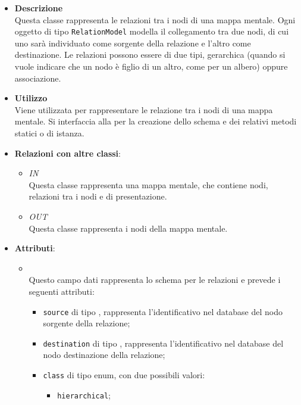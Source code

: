 \begin{itemize}
\item \textbf{Descrizione}\\
Questa classe rappresenta le relazioni tra i nodi di una mappa mentale. Ogni oggetto di tipo \texttt{RelationModel} modella il collegamento tra due nodi, di cui uno sarà individuato come sorgente della relazione e l’altro come destinazione. Le relazioni possono essere di due tipi, gerarchica (quando si vuole indicare che un nodo è figlio di un altro, come per un albero) oppure associazione.
\item \textbf{Utilizzo}\\
Viene utilizzata per rappresentare le relazione tra i nodi di una mappa mentale. Si interfaccia alla   per la creazione dello schema e dei relativi metodi statici o di istanza.
\item \textbf{Relazioni con altre classi}:
\begin{itemize}
\item \textit{IN} \hyperref[\nogloxy{Premi::Back-End::App::Models::ProjectModel}]{}\\
Questa classe rappresenta una mappa mentale, che contiene nodi, relazioni tra i nodi e  di presentazione.
\item \textit{OUT} \hyperref[\nogloxy{Premi::Back-End::App::Models::NodeModel}]{}\\
Questa classe rappresenta i nodi della mappa mentale.
\end{itemize}
\item \textbf{Attributi}:
\begin{itemize}
\item {}
\\ Questo campo dati rappresenta lo schema  per le relazioni e prevede i seguenti attributi:
\begin{itemize}
\item \texttt{source} di tipo \texttt{}, rappresenta l’identificativo nel database del nodo sorgente della relazione;
\item \texttt{destination} di tipo \texttt{}, rappresenta l’identificativo nel database del nodo destinazione della relazione;
\item \texttt{class} di tipo enum, con due possibili valori:
\begin{itemize}
\item \texttt{hierarchical};

\end{itemize}
\end{itemize}
\end{itemize}
\end{itemize}
